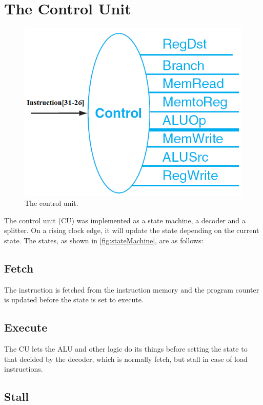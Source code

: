\section{The Control Unit}
\begin{figure}[ht]
    \centering
    \includegraphics[scale=0.3]{figures/controlunit.png}
    \caption{\label{fig:controlUnit}The control unit.}
\end{figure}

The control unit (CU) was implemented as a state machine, a decoder and a
splitter. On a rising clock edge, it will update the state depending on the
current state. The states, as shown in \ref{fig:stateMachine}, are as follows:

\subsection{Fetch}

The instruction is fetched from the instruction memory and the program counter
is updated before the state is set to execute.

\subsection{Execute}

The CU lets the ALU and other logic do its things before setting the state to
that decided by the decoder, which is normally fetch, but stall in case of load
instructions.

\subsection{Stall}

